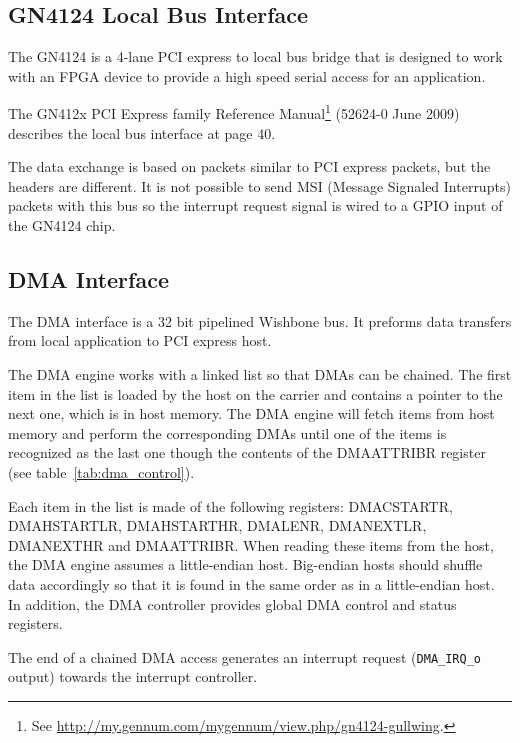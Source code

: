 \documentclass[10pt,a4paper]{cerndoc}
\begin{document}
    \subsection{GN4124 Local Bus Interface}
    
The GN4124 is a 4-lane PCI express to local bus bridge that is designed to work with an FPGA device to provide a high speed serial access for an application.
    
The GN412x PCI Express family Reference Manual\footnote{See \href{http://my.gennum.com/mygennum/view.php/gn4124-gullwing}{http://my.gennum.com/mygennum/view.php/gn4124-gullwing}.} (52624-0 June 2009) describes the local bus interface at page 40.

The data exchange is based on packets similar to PCI express packets, but the headers are different. It is not possible to send MSI (Message Signaled Interrupts) packets with this bus so the interrupt request signal is wired to a GPIO input of the GN4124 chip.
    
    \subsection{DMA Interface}
The DMA interface is a 32 bit pipelined Wishbone bus. It preforms data transfers from local application to PCI express host.

The DMA engine works with a linked list so that DMAs can be chained. The first item in the list is loaded by the host on the carrier and contains a pointer to the next one, which is in host memory. The DMA engine will fetch items from host memory and perform the corresponding DMAs until one of the items is recognized as the last one though the contents of the DMAATTRIBR register (see table~\ref{tab:dma_control}). 

Each item in the list is made of the following registers: DMACSTARTR, DMAHSTARTLR, DMAHSTARTHR, DMALENR, DMANEXTLR, DMANEXTHR and DMAATTRIBR. When reading these items from the host, the DMA engine assumes a little-endian host. Big-endian hosts should shuffle data accordingly so that it is found in the same order as in a little-endian host. In addition, the DMA controller provides global DMA control and status registers.

The end of a chained DMA access generates an interrupt request (\verb+DMA_IRQ_o+ output) towards the interrupt controller.  
\end{document}
